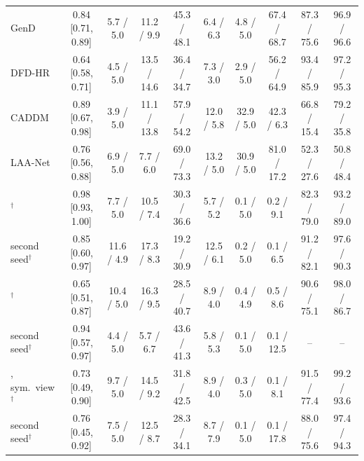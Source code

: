 \begin{tabular}{@{}l c cccccccc@{}}
GenD~\cite{gend2026} & 0.84 [0.71, 0.89] & 5.7 / 5.0 & 11.2 / 9.9 & 45.3 / 48.1 & 6.4 / 6.3 & 4.8 / 5.0 & 67.4 / 68.7 & 87.3 / 75.6 & 96.9 / 96.6 \\
DFD-HR~\cite{dfdhr2026} & 0.64 [0.58, 0.71] & 4.5 / 5.0 & 13.5 / 14.6 & 36.4 / 34.7 & 7.3 / 3.0 & 2.9 / 5.0 & 56.2 / 64.9 & 93.4 / 85.9 & 97.2 / 95.3 \\
CADDM~\cite{caddm} & 0.89 [0.67, 0.98] & 3.9 / 5.0 & 11.1 / 13.8 & 57.9 / 54.2 & 12.0 / 5.8 & 32.9 / 5.0 & 42.3 / 6.3 & 66.8 / 15.4 & 79.2 / 35.8 \\
LAA-Net~\cite{laanet} & 0.76 [0.56, 0.88] & 6.9 / 5.0 & 7.7 / 6.0 & 69.0 / 73.3 & 13.2 / 5.0 & 30.9 / 5.0 & 81.0 / 17.2 & 52.3 / 27.6 & 50.8 / 48.4 \\
\midrule
\oursB{}$^\dagger$ & 0.98 [0.93, 1.00] & 7.7 / 5.0 & 10.5 / 7.4 & 30.3 / 36.6 & 5.7 / 5.2 & 0.1 / 5.0 & 0.2 / 9.1 & 82.3 / 79.0 & 93.2 / 89.0 \\
\quad second seed$^\dagger$ & 0.85 [0.60, 0.97] & 11.6 / 4.9 & 17.3 / 8.3 & 19.2 / 30.9 & 12.5 / 6.1 & 0.2 / 5.0 & 0.1 / 6.5 & 91.2 / 82.1 & 97.6 / 90.3 \\
\oursF{}$^\dagger$ & 0.65 [0.51, 0.87] & 10.4 / 5.0 & 16.3 / 9.5 & 28.5 / 40.7 & 8.9 / 4.0 & 0.4 / 4.9 & 0.5 / 8.6 & 90.6 / 75.1 & 98.0 / 86.7 \\
\quad second seed$^\dagger$ & 0.94 [0.57, 0.97] & 4.4 / 5.0 & 5.7 / 6.7 & 43.6 / 41.3 & 5.8 / 5.3 & 0.1 / 5.0 & 0.1 / 12.5 & -- & -- \\
\oursF{}, sym.\ view$^\dagger$ & 0.73 [0.49, 0.90] & 9.7 / 5.0 & 14.5 / 9.2 & 31.8 / 42.5 & 8.9 / 4.0 & 0.3 / 5.0 & 0.1 / 8.1 & 91.5 / 77.4 & 99.2 / 93.6 \\
\quad second seed$^\dagger$ & 0.76 [0.45, 0.92] & 7.5 / 5.0 & 12.5 / 8.7 & 28.3 / 34.1 & 8.7 / 7.9 & 0.1 / 5.0 & 0.1 / 17.8 & 88.0 / 75.6 & 97.4 / 94.3 \\
\bottomrule
\end{tabular}
